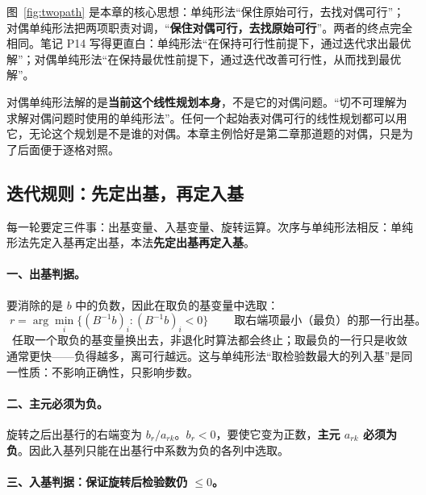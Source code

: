 图~\ref{fig:twopath} 是本章的核心思想：单纯形法“保住原始可行，去找对偶可行”；对偶单纯形法把两项职责对调，“\textbf{保住对偶可行，去找原始可行}”。两者的终点完全相同。笔记 P14 写得更直白：单纯形法“在保持可行性前提下，通过迭代求出最优解”；对偶单纯形法“在保持最优性前提下，通过迭代改善可行性，从而找到最优解”。

\begin{warningbox}[名称的一处提醒（课件 P25、笔记 P14）]
对偶单纯形法解的是\textbf{当前这个线性规划本身}，不是它的对偶问题。“切不可理解为求解对偶问题时使用的单纯形法”。任何一个起始表对偶可行的线性规划都可以用它，无论这个规划是不是谁的对偶。本章主例恰好是第二章那道题的对偶，只是为了后面便于逐格对照。
\end{warningbox}

\subsection{迭代规则：先定出基，再定入基}

每一轮要定三件事：出基变量、入基变量、旋转运算。次序与单纯形法相反：单纯形法先定入基再定出基，本法\textbf{先定出基再定入基}。

\paragraph{一、出基判据。}要消除的是 $b$ 中的负数，因此在取负的基变量中选取：
\[
\boxed{\;r=\arg\min_i\{(B^{-1}b)_i:(B^{-1}b)_i<0\}\;}\qquad\text{取右端项最小（最负）的那一行出基。}
\]
\ 任取一个取负的基变量换出去，非退化时算法都会终止；取最负的一行只是收敛通常更快——负得越多，离可行越远。这与单纯形法“取检验数最大的列入基”是同一性质：不影响正确性，只影响步数。

\paragraph{二、主元必须为负。}旋转之后出基行的右端变为 $b_r/a_{rk}$。$b_r<0$，要使它变为正数，\textbf{主元 $a_{rk}$ 必须为负}。因此入基列只能在出基行中系数为负的各列中选取。

\paragraph{三、入基判据：保证旋转后检验数仍 $\le0$。}


